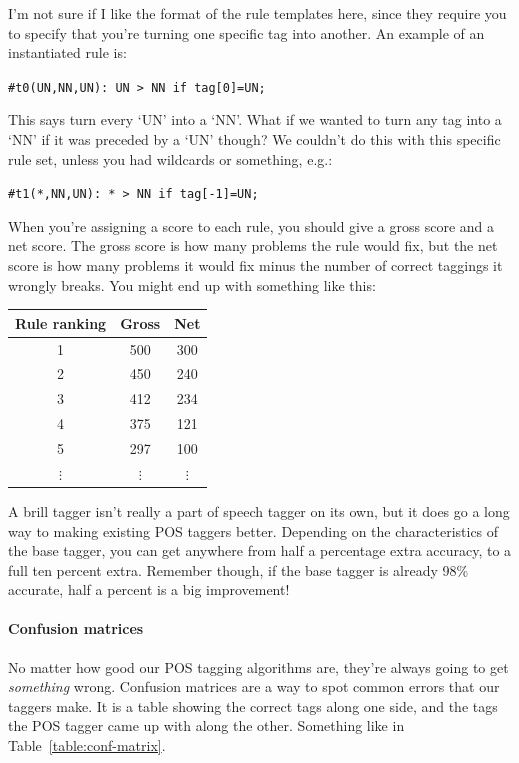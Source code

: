 \begin{description}
  I'm not sure if I like the format of the rule templates here, since they
  require you to specify that you're turning one specific tag into another. An
  example of an instantiated rule is:

  \texttt{\#t0(UN,NN,UN): UN > NN if tag[0]=UN;}

  This says turn every `UN' into a `NN'. What if we wanted to turn any tag into
  a `NN' if it was preceded by a `UN' though? We couldn't do this with this
  specific rule set, unless you had wildcards or something, e.g.:

  \texttt{\#t1(*,NN,UN): * > NN if tag[-1]=UN;}

  When you're assigning a score to each rule, you should give a gross score and
  a net score. The gross score is how many problems the rule would fix, but the
  net score is how many problems it would fix minus the number of correct
  taggings it wrongly breaks. You might end up with something like this:

  \begin{center}
    \begin{tabular} {|c|c|c|}
      \hline
      Rule ranking & Gross & Net\\ \hline
      1 & 500 & 300\\ \hline
      2 & 450 & 240\\ \hline
      3 & 412 & 234\\ \hline
      4 & 375 & 121\\ \hline
      5 & 297 & 100\\ \hline
      $\vdots$ & $\vdots$ & $\vdots$\\ 
    \end{tabular}
  \end{center}

  A brill tagger isn't really a part of speech tagger on its own, but it does go
  a long way to making existing POS taggers better. Depending on the
  characteristics of the base tagger, you can get anywhere from half a
  percentage extra accuracy, to a full ten percent extra. Remember though, if
  the base tagger is already 98\% accurate, half a percent is a big improvement!
\end{description}

\paragraph{Confusion matrices}

No matter how good our POS tagging algorithms are, they're always going to get
\textit{something} wrong. Confusion matrices are a way to spot common errors
that our taggers make. It is a table showing the correct tags along one side,
and the tags the POS tagger came up with along the other. Something like in
Table~\ref{table:conf-matrix}.

